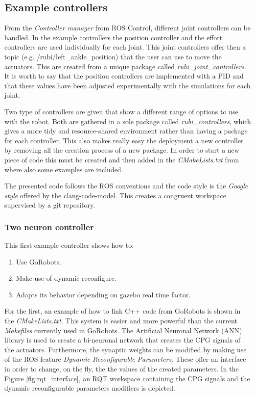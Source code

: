 
\subsection{Example controllers} %
\label{sub:example_controllers}
From the \textit{Controller manager} from ROS Control, different joint controllers can be handled.
In the example controllers the position controller and the effort controllers are used individually for each joint.
This joint controllers offer then a topic (e.g. /rubi/left\_ankle\_position) that the user can use to move the actuators.
This are created from a unique package called \textit{rubi\_joint\_controllers}.
It is worth to say that the position controllers are implemented with a PID and that these values have been adjusted experimentally with the simulations for each joint.

Two type of controllers are given that show a different range of options to use with the robot.
Both are gathered in a sole package called \textit{rubi\_controllers}, which gives a more tidy and resource-shared environment rather than having a package for each controller.
This also makes really easy the deployment a new controller by removing all the creation process of a new package.
In order to start a new piece of code this must be created and then added in the \textit{CMakeLists.txt} from where also some examples are included.

The presented code follows the ROS conventions and the code style is the \textit{Google style} offered by the clang-code-model.
This creates a congruent workspace supervised by a git repository.

\subsubsection{Two neuron controller} %
\label{ssub:two_neuron_controller}
This first example controller shows how to:
\begin{enumerate}
    \item Use GoRobots.
    \item Make use of dynamic reconfigure.
    \item Adapts its behavior depending on gazebo real time factor.
\end{enumerate}
For the first, an example of how to link C++ code from GoRobots is shown in the \textit{CMakeLists.txt}.
This system is easier and more powerful than the current \textit{Makefiles} currently used in GoRobots.
The Artificial Neuronal Network (ANN) library is used to create a bi-neuronal network that creates the CPG signals of the actuators.
Furthermore, the synaptic weights can be modified by making use of the ROS feature \textit{Dynamic Reconfigurable Parameters}.
These offer an interface in order to change, on the fly, the the values of the created parameters.
In the Figure \ref{fig:rqt_interface}, an RQT workspace containing the CPG signals and the dynamic reconfigurable parameters modifiers is depicted.

